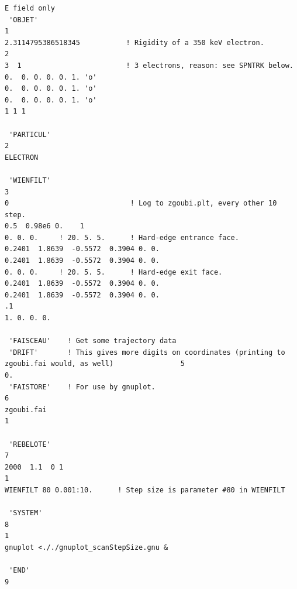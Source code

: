 \documentclass[10pt]{article}
\begin{document}
{\tiny
\begin{verbatim}
E field only
 'OBJET'                                                                                                      1
2.3114795386518345           ! Rigidity of a 350 keV electron.
2
3  1                         ! 3 electrons, reason: see SPNTRK below.
0.  0. 0. 0. 0. 1. 'o'
0.  0. 0. 0. 0. 1. 'o'
0.  0. 0. 0. 0. 1. 'o'
1 1 1
 
 'PARTICUL'                                                                                                   2
ELECTRON
 
 'WIENFILT'                                                                                                   3
0                             ! Log to zgoubi.plt, every other 10 step.
0.5  0.98e6 0.    1
0. 0. 0.     ! 20. 5. 5.      ! Hard-edge entrance face.
0.2401  1.8639  -0.5572  0.3904 0. 0.
0.2401  1.8639  -0.5572  0.3904 0. 0.
0. 0. 0.     ! 20. 5. 5.      ! Hard-edge exit face.
0.2401  1.8639  -0.5572  0.3904 0. 0.
0.2401  1.8639  -0.5572  0.3904 0. 0.
.1
1. 0. 0. 0.
 
 'FAISCEAU'    ! Get some trajectory data
 'DRIFT'       ! This gives more digits on coordinates (printing to zgoubi.fai would, as well)                5
0.
 'FAISTORE'    ! For use by gnuplot.                                                                          6
zgoubi.fai
1
 
 'REBELOTE'                                                                                                   7
2000  1.1  0 1
1
WIENFILT 80 0.001:10.      ! Step size is parameter #80 in WIENFILT
 
 'SYSTEM'                                                                                                     8
1
gnuplot <././gnuplot_scanStepSize.gnu &
 
 'END'                                                                                                        9
\end{verbatim}
}

\bigskip
\end{document}
